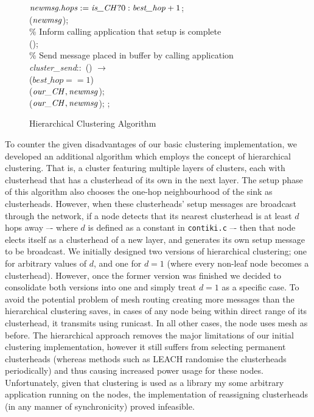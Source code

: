 \begin{figure}[H]
\begin{boxedminipage}{\linewidth}
    \null\qq\qq $\mbox{\emph{newmsg.hops}} \mathrel{:=} \mbox{\emph{is\_CH}} ? 0 : \mbox{\emph{best\_hop}}+1$;\\
    \null\qq\qq {}($\mbox{\emph{newmsg}}$);\\
    \null\qq\qq \% Inform calling application that setup is complete\\
    \null\qq\qq {}();\\
    \null\qq \% Send message placed in buffer by calling application\\
	\null\qq \emph{cluster\_send}::~() $\rightarrow$\\
    \null\qq\qq {} ($best\_hop == 1$)  \\
    \null\qq\qq\qq {}($\mbox{\emph{our\_CH}}, \mbox{\emph{newmsg}}$);
    \null\qq\qq {}\\    
    \null\qq\qq\qq {}($\mbox{\emph{our\_CH}}, \mbox{\emph{newmsg}}$);
    \null\qq\qq {}; \\
  \end{boxedminipage}
  \caption{Hierarchical Clustering Algorithm}
\end{figure}

To counter the given disadvantages of our basic clustering implementation, we developed an additional algorithm which employs the concept of hierarchical clustering. That is, a cluster featuring multiple layers of clusters, each with  clusterhead that has a clusterhead of its own in the next layer. The setup phase of this algorithm also chooses the one-hop neighbourhood of the sink as clusterheads. However, when these clusterheads' setup messages are broadcast through the network, if a node detects that its nearest clusterhead is at least $d$ hops away –- where $d$ is defined as a constant in \verb|contiki.c| –- then that node elects itself as a clusterhead of a new layer, and generates its own setup message to be broadcast. We initially designed two versions of hierarchical clustering; one for arbitrary values of $d$, and one for $d=1$ (where every non-leaf node becomes a clusterhead). However, once the former version was finished we decided to consolidate both versions into one and simply treat $d=1$ as a specific case. To avoid the potential problem of mesh routing creating more messages than the hierarchical clustering saves, in cases of any node being within direct range of its clusterhead, it transmits using runicast. In all other cases, the node uses mesh as before. The hierarchical approach removes the major limitations of our initial clustering implementation, however it still suffers from selecting permanent clusterheads (whereas methods such as LEACH randomise the clusterheads periodically) and thus causing increased power usage for these nodes. Unfortunately, given that clustering is used as a library my some arbitrary application running on the nodes, the implementation of reassigning clusterheads (in any manner of synchronicity) proved infeasible.

